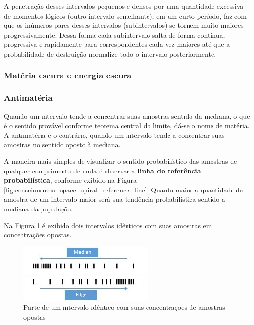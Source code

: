 A penetração desses intervalos pequenos e densos por uma quantidade excessiva de momentos lógicos (outro intervalo semelhante), em um curto período, faz com que os inúmeros pares desses intervalos (subintervalos) se tornem muito maiores progressivamente. Dessa forma cada subintervalo salta de forma continua, progressiva e rapidamente para correspondentes cada vez maiores até que a probabilidade de destruição normalize todo o intervalo posteriormente.

\subsubsection{Matéria escura e energia escura}


\subsubsection{Antimatéria}
Quando um intervalo tende a concentrar suas amostras sentido da mediana, o que é o sentido provável conforme teorema central do limite, dá-se o nome de matéria. A antimatéria é o contrário, quando um intervalo tende a concentrar suas amostras no sentido oposto à mediana. 

A maneira mais simples de visualizar o sentido probabilístico das amostras de qualquer comprimento de onda é observar a \textbf{linha de referência probabilística}, conforme exibido na Figura \ref{fig:consciousness_space_spiral_reference_line}. Quanto maior a quantidade de amostra de um intervalo maior será sua tendência probabilística sentido a mediana da população.

Na Figura \ref{fig:consciousness_concentration_of_opposite_samples} é exibido dois intervalos idênticos com suas amostras em concentrações opostas.
	\begin{figure}[H]
	\caption{Parte de um intervalo idêntico com suas concentrações de amostras opostas}
	\label{fig:consciousness_concentration_of_opposite_samples}
	\centering
	\includegraphics[scale=1.2]{sections/images/consciousness_concentration_of_opposite_samples.jpg}
	\end{figure}


